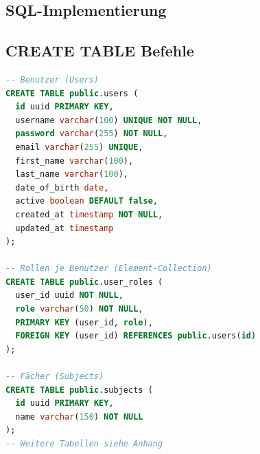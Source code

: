 \documentclass[12pt,a4paper]{article}
\begin{document}

    \subsection{SQL-Implementierung}

    \subsection{CREATE TABLE Befehle}
    \begin{lstlisting}[language=SQL]
-- Benutzer (Users)
CREATE TABLE public.users (
  id uuid PRIMARY KEY,
  username varchar(100) UNIQUE NOT NULL,
  password varchar(255) NOT NULL,
  email varchar(255) UNIQUE,
  first_name varchar(100),
  last_name varchar(100),
  date_of_birth date,
  active boolean DEFAULT false,
  created_at timestamp NOT NULL,
  updated_at timestamp
);

-- Rollen je Benutzer (Element-Collection)
CREATE TABLE public.user_roles (
  user_id uuid NOT NULL,
  role varchar(50) NOT NULL,
  PRIMARY KEY (user_id, role),
  FOREIGN KEY (user_id) REFERENCES public.users(id)
);

-- Fächer (Subjects)
CREATE TABLE public.subjects (
  id uuid PRIMARY KEY,
  name varchar(150) NOT NULL
);
-- Weitere Tabellen siehe Anhang
    \end{lstlisting}
\end{document}
